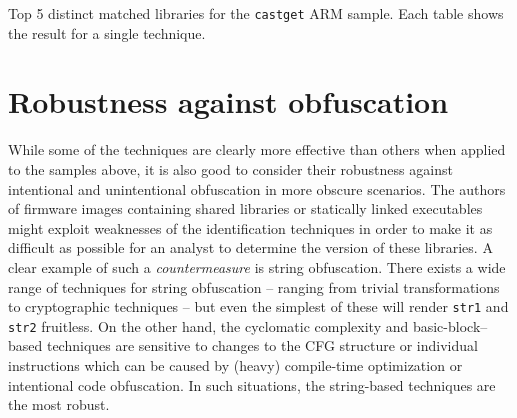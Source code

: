 \documentclass[twocolumn,a4paper]{IEEEtran} %
\begin{document}
\begin{table*}[t]
    \caption{Top 5 distinct matched libraries for the \texttt{castget} ARM sample. Each table shows the result for a single technique.}
    \vspace{.5cm}
    \label{table:castget-results}
\end{table*}








\section{Robustness against obfuscation}

While some of the techniques are clearly more effective than others when applied to the samples above, it is also good to consider their robustness against intentional and unintentional obfuscation in more obscure scenarios. The authors of firmware images containing shared libraries or statically linked executables might exploit weaknesses of the identification techniques in order to make it as difficult as possible for an analyst to determine the version of these libraries. A clear example of such a \emph{countermeasure} is string obfuscation. There exists a wide range of techniques for string obfuscation -- ranging from trivial transformations to cryptographic techniques -- but even the simplest of these will render \texttt{str1} and \texttt{str2} fruitless. On the other hand, the cyclomatic complexity and basic-block--based techniques are sensitive to changes to the CFG structure or individual instructions which can be caused by (heavy) compile-time optimization or intentional code obfuscation. In such situations, the string-based techniques are the most robust.
\end{document}
